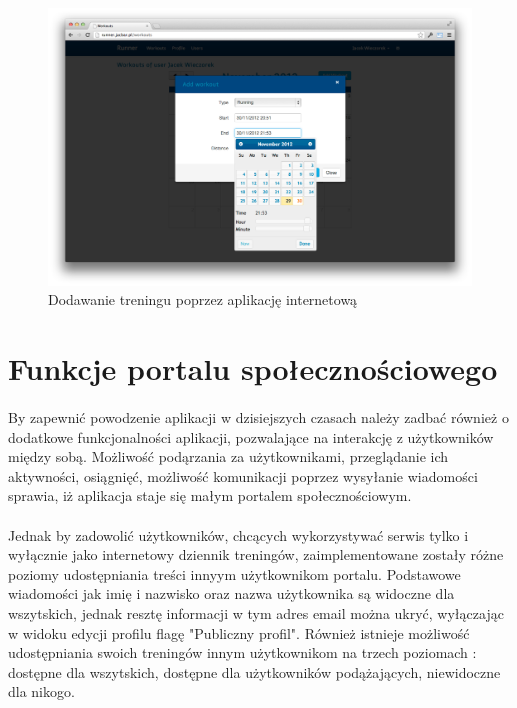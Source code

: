 \begin{figure}[ht]
	\centering
		\includegraphics[width=1\linewidth]{assets/add_workout2.png}
	\caption{Dodawanie treningu poprzez aplikację internetową}
	\label{fig:add_workout}
\end{figure}

\section{Funkcje portalu społecznościowego} %
\label{sec:profil_u_ytkownika}
\paragraph{} %
\label{par:}
By zapewnić powodzenie aplikacji w dzisiejszych czasach należy zadbać również o dodatkowe funkcjonalności aplikacji, pozwalające na interakcję z użytkowników między sobą. Możliwość podąrzania za użytkownikami, przeglądanie ich aktywności, osiągnięć, możliwość komunikacji poprzez wysyłanie wiadomości sprawia, iż aplikacja staje się małym portalem społecznościowym. 
\paragraph{} %
\label{par:}

Jednak by zadowolić użytkowników, chcących wykorzystywać serwis tylko i wyłącznie jako internetowy dziennik treningów, zaimplementowane zostały różne poziomy udostępniania treści innyym użytkownikom portalu. Podstawowe wiadomości jak imię i nazwisko oraz nazwa użytkownika są widoczne dla wszytskich, jednak resztę informacji w tym adres email można ukryć, wyłączając w widoku edycji profilu flagę "Publiczny profil". Również istnieje możliwość udostępniania swoich treningów innym użytkownikom na trzech poziomach : dostępne dla wszytskich, dostępne dla użytkowników podążających, niewidoczne dla nikogo.

